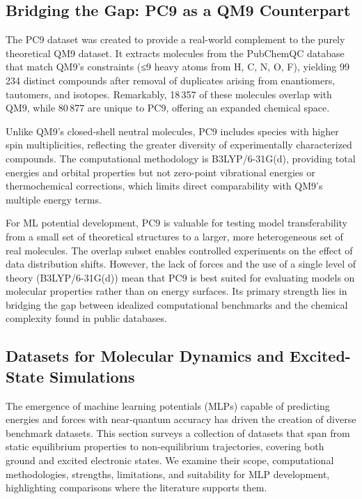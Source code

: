 \documentclass[12pt]{article}
\begin{document}
\subsection{Bridging the Gap: PC9 as a QM9 Counterpart}

The PC9 dataset \cite{ds16-26} was created to provide a real-world complement to the purely theoretical QM9 dataset. It extracts molecules from the PubChemQC database that match QM9’s constraints (≤9 heavy atoms from {H, C, N, O, F}), yielding 99\,234 distinct compounds after removal of duplicates arising from enantiomers, tautomers, and isotopes. Remarkably, 18\,357 of these molecules overlap with QM9, while 80\,877 are unique to PC9, offering an expanded chemical space.

Unlike QM9’s closed-shell neutral molecules, PC9 includes species with higher spin multiplicities, reflecting the greater diversity of experimentally characterized compounds. The computational methodology is B3LYP/6-31G(d), providing total energies and orbital properties but not zero-point vibrational energies or thermochemical corrections, which limits direct comparability with QM9’s multiple energy terms.

For ML potential development, PC9 is valuable for testing model transferability from a small set of theoretical structures to a larger, more heterogeneous set of real molecules. The overlap subset enables controlled experiments on the effect of data distribution shifts. However, the lack of forces and the use of a single level of theory (B3LYP/6-31G(d)) mean that PC9 is best suited for evaluating models on molecular properties rather than on energy surfaces. Its primary strength lies in bridging the gap between idealized computational benchmarks and the chemical complexity found in public databases.

\subsection{Datasets for Molecular Dynamics and Excited-State Simulations}

The emergence of machine learning potentials (MLPs) capable of predicting energies and forces with near-quantum accuracy has driven the creation of diverse benchmark datasets. This section surveys a collection of datasets that span from static equilibrium properties to non-equilibrium trajectories, covering both ground and excited electronic states. We examine their scope, computational methodologies, strengths, limitations, and suitability for MLP development, highlighting comparisons where the literature supports them.
\end{document}
